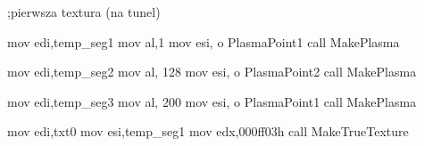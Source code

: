 ;pierwsza textura (na tunel)

	mov   edi,temp_seg1
	mov   al,1
	mov   esi, o PlasmaPoint1
	call  MakePlasma

	mov   edi,temp_seg2
	mov   al, 128
	mov   esi, o PlasmaPoint2
	call  MakePlasma

	mov   edi,temp_seg3
	mov   al, 200
	mov   esi, o PlasmaPoint1
	call  MakePlasma

	mov   edi,txt0
	mov   esi,temp_seg1
	mov   edx,000ff03h
	call  MakeTrueTexture
